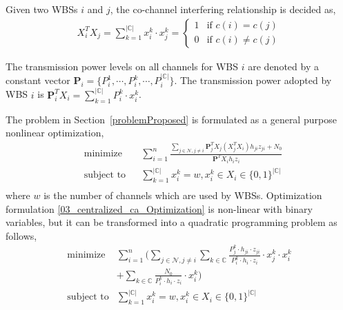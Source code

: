 \documentclass[times]{ettauth}
\theoremstyle{mytheoremstyle}
\theoremstyle{mytheoremstyle}
\theoremstyle{mytheoremstyle}
\renewcommand{\vec}[1]{\mathbf{#1}}
\begin{document}
Given two WBSs $i$ and $j$, the co-channel interfering relationship is decided as,
\begin{equation}
\begin{split}
X_i^TX_j = \sum\limits_{k=1}^{|\mathbb{C}|}x_i^k\cdot x_j^k = 
\left\{ \begin{array}{ll}
1 & \mbox{if $c(i)=c(j)$} \\
0 & \mbox{if $c(i)\neq c(j)$} 
\end{array}
\right.
\end{split}
\end{equation}

The transmission power levels on all channels for WBS $i$ are denoted by a constant vector $\vec{P}_i = \{P_i^1,\cdots, P_i^k,\cdots, P_i^{|\mathbb{C}|}\}$. 
The transmission power adopted by WBS $i$ is $\vec{P}_i^TX_i = \sum\limits_{k=1}^{|\mathbb{C}|}P_{i}^k\cdot x_i^k$.


The problem in Section~\ref{problemProposed} is formulated as a general purpose nonlinear optimization,
	\begin{equation}
\label{03_centralized_ca_Optimization}
		\begin{aligned}
		& \underset{}{\text{minimize}}
		& & \sum\limits^{n}_{i=1} \frac{\sum\limits_{j\in\mathcal{N}, j\neq i}\vec{P}_j^TX_j(X_j^TX_i)h_{ji}z_{ji} + N_0}{\vec{P}^TX_ih_iz_i}\\
		& \text{subject to}
		& & \sum\limits_{k=1}^{|\mathbb{C}|}x_i^k=w, x_i^k\in X_i\in \{0,1\}^{|\mathbb{C}|}\\
		\end{aligned}
	\end{equation}
where $w$ is the number of channels which are used by WBSs. 
Optimization formulation \ref{03_centralized_ca_Optimization} is non-linear with binary variables, but it can be transformed into a quadratic programming problem as follows,
	\begin{equation}
\label{QLP_2}
			\begin{aligned}
			\underset{}{\text{minimize}}
			& \sum\limits^{n}_{i=1} ( \sum\limits_{j\in\mathcal{N}, j\neq i}\sum\limits_{k\in\mathbb{C}} \frac{P_j^k\cdot h_{ji}\cdot z_{ji}}{P_i^k\cdot h_i\cdot z_i}\cdot  x_j^k\cdot x_i^k  \\
			& + \sum\limits_{k\in\mathbb{C}} \frac{N_0}{P_i^k\cdot h_i\cdot z_i}\cdot x_i^k)\\
			\text{subject to} 
			& \sum\limits_{k=1}^{|\mathbb{C}|}x_i^k=w, x_i^k\in X_i\in \{0,1\}^{|\mathbb{C}|}\\
			\end{aligned}
		\end{equation}
\end{document}
